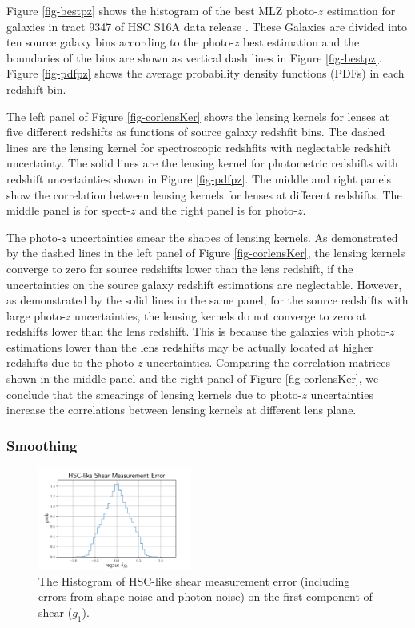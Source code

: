 \documentclass[twocolumn]{aastex62}
\begin{document}
Figure \ref{fig-bestpz} shows the histogram of the best MLZ photo-$z$ estimation \cite{HSC1-photoz} for galaxies in tract 
9347 of HSC S16A data release \citep{HSC1-data}. These Galaxies are divided into ten source galaxy bins according to the 
photo-$z$ best estimation and the boundaries of the bins are shown as vertical dash lines in Figure \ref{fig-bestpz}. Figure \ref{fig-pdfpz} shows the average probability density functions (PDFs) in each redshift bin. 

The left panel of Figure \ref{fig-corlensKer} shows the lensing kernels for lenses at five different redshifts as functions 
of source galaxy redshfit bins. The dashed lines are the lensing kernel for spectroscopic redshfits with neglectable redshift 
uncertainty. The solid lines are the lensing kernel for photometric redshifts with redshift uncertainties shown in Figure 
\ref{fig-pdfpz}. The middle and right panels show the correlation between lensing kernels for lenses at different redshifts. 
The middle panel is for spect-$z$ and the right panel is for photo-$z$.

The photo-$z$ uncertainties smear the shapes of lensing kernels. As demonstrated by the dashed lines in the left panel of 
Figure \ref{fig-corlensKer}, the lensing kernels converge to zero for source redshifts lower than the lens redshift, if the 
uncertainties on the source galaxy redshift estimations are neglectable. However, as demonstrated by the solid lines in the 
same panel, for the source redshifts with large photo-$z$ uncertainties, the lensing kernels do not converge to zero at 
redshifts lower than the lens redshift. This is because the galaxies with photo-$z$ estimations lower than the lens redshifts 
may be actually located at higher redshifts due to the photo-$z$ uncertainties.
Comparing the correlation matrices shown in the middle panel and the right panel of Figure \ref{fig-corlensKer}, we conclude 
that the smearings of lensing kernels due to photo-$z$ uncertainties increase the correlations between lensing kernels at 
different lens plane.

\subsubsection{Smoothing}
\label{subsec:method-smoothing}

\begin{figure}[!t]
 \centering
 \includegraphics[width=0.45\textwidth]{shapeMeasurementError-HSCY1.pdf}
 \caption{The Histogram of HSC-like shear measurement error (including errors from shape noise and photon noise) on the 
        first component of shear ($g_1$).}
 \label{fig:mass-redshift}
\end{figure}
\end{document}
